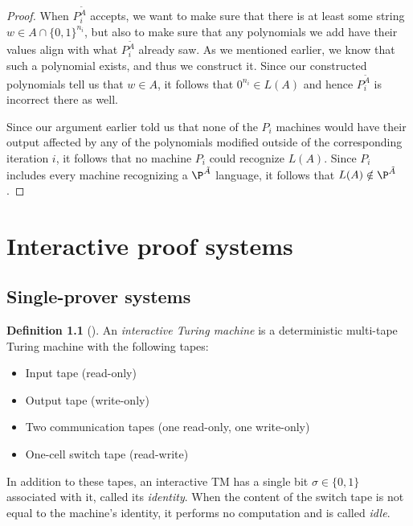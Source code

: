 \documentclass[english]{reedthesis}
\theoremstyle{plain}
\theoremstyle{definition}
\newtheorem{defn}[defn]{Definition}
\theoremstyle{remark}
\begin{document}
\begin{proof}
  When $P_{i}^{\tilde{A}}$ accepts, we want to make sure that there is at least
  some string $w \in A \cap \{0, 1\}^{n_{i}}$, but also to make sure that any
  polynomials we add have their values align with what $P_{i}^{\tilde{A}}$
  already saw. As we mentioned earlier, we know that such a polynomial exists,
  and thus we construct it. Since our constructed polynomials tell us that
  $w \in A$, it follows that $0^{n_{i}} \in L(A)$ and hence $P_{i}^{\tilde{A}}$ is
  incorrect there as well.

  Since our argument earlier told us that none of the $P_{i}$ machines would
  have their output affected by any of the polynomials modified outside of the
  corresponding iteration $i$, it follows that no machine $P_{i}$ could
  recognize $L(A)$. Since $P_{i}$ includes every machine recognizing a
  $\P^{\tilde{A}}$ language, it follows that $L(A) \notin \P^{\tilde{A}}$.
\end{proof}

\chapter{Interactive proof systems}\label{chap:ips}

\section{Single-prover systems}\label{sec:zero-prover}

\begin{defn}[{\cite[Def.\ 4.2.1]{Go01}}]\label{def:interactive-tm}
  An \emph{interactive Turing machine} is a deterministic multi-tape Turing
  machine with the following tapes:
  \begin{itemize}
    \item Input tape (read-only)
    \item Output tape (write-only)
    \item Two communication tapes (one read-only, one write-only)
    \item One-cell switch tape (read-write)
  \end{itemize}
  In addition to these tapes, an interactive TM has a single bit $\sigma \in \{0, 1\}$
  associated with it, called its \emph{identity}. When the content of the switch
  tape is not equal to the machine's identity, it performs no computation and is
  called \emph{idle}.
\end{defn}
\end{document}
